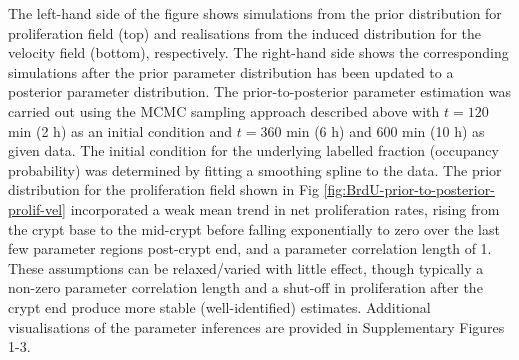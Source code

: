 \documentclass[10pt,letterpaper]{article}
\begin{document}
The left-hand side of the figure shows simulations from the prior
distribution for proliferation field (top) and realisations from the
induced distribution for the velocity field (bottom), respectively. The
right-hand side shows the corresponding simulations after the prior
parameter distribution has been updated to a posterior parameter
distribution. The prior-to-posterior parameter estimation was carried
out using the MCMC sampling approach described above with \(t = 120\)
min (2 h) as an initial condition and \(t = 360\) min (6 h) and \(600\)
min (10 h) as given data. The initial condition for the underlying
labelled fraction (occupancy probability) was determined by fitting a
smoothing spline to the data. The prior distribution for the
proliferation field shown in Fig
\ref{fig:BrdU-prior-to-posterior-prolif-vel} incorporated a weak mean
trend in net proliferation rates, rising from the crypt base to the
mid-crypt before falling exponentially to zero over the last few
parameter regions post-crypt end, and a parameter correlation length of
1. These assumptions can be relaxed/varied with little effect, though
typically a non-zero parameter correlation length and a shut-off in
proliferation after the crypt end produce more stable (well-identified)
estimates. Additional visualisations of the parameter inferences are
provided in Supplementary Figures 1-3.
\end{document}

